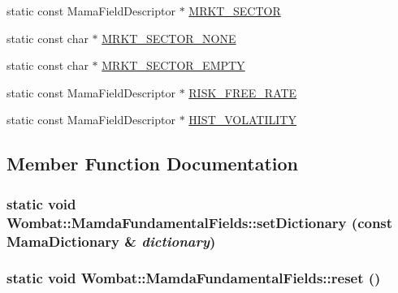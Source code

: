 \begin{CompactItemize}
\item 
static const Mama\-Field\-Descriptor $\ast$ \hyperlink{classWombat_1_1MamdaFundamentalFields_6e28bc03e238b7dbeacefccafa4fad37}{MRKT\_\-SECTOR}
\item 
static const char $\ast$ \hyperlink{classWombat_1_1MamdaFundamentalFields_78a5b6970d4870642faa9cb5554c20e2}{MRKT\_\-SECTOR\_\-NONE}
\item 
static const char $\ast$ \hyperlink{classWombat_1_1MamdaFundamentalFields_9a10c472fddc29714e5498ce3ec4df71}{MRKT\_\-SECTOR\_\-EMPTY}
\item 
static const Mama\-Field\-Descriptor $\ast$ \hyperlink{classWombat_1_1MamdaFundamentalFields_f96a9a7c8d09ac71d15e2ce8dd381536}{RISK\_\-FREE\_\-RATE}
\item 
static const Mama\-Field\-Descriptor $\ast$ \hyperlink{classWombat_1_1MamdaFundamentalFields_3d113861160b785006a93b704cd21f69}{HIST\_\-VOLATILITY}
\end{CompactItemize}


\subsection{Member Function Documentation}
\hypertarget{classWombat_1_1MamdaFundamentalFields_3d638ca8f449c896788024326b50efb9}{
\subsubsection[setDictionary]{\setlength{\rightskip}{0pt plus 5cm}static void Wombat::Mamda\-Fundamental\-Fields::set\-Dictionary (const Mama\-Dictionary \& {\em dictionary})}}
\label{classWombat_1_1MamdaFundamentalFields_3d638ca8f449c896788024326b50efb9}


\hypertarget{classWombat_1_1MamdaFundamentalFields_5584ab834e87c24cfae48ed21870a067}{
\subsubsection[reset]{\setlength{\rightskip}{0pt plus 5cm}static void Wombat::Mamda\-Fundamental\-Fields::reset ()}}
\label{classWombat_1_1MamdaFundamentalFields_5584ab834e87c24cfae48ed21870a067}


